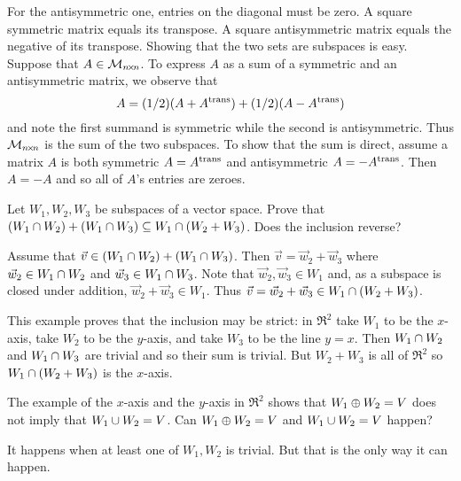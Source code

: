 \begin{exercises}
\begin{answer}
\begin{exparts}
          For the antisymmetric one, entries on the diagonal must be zero.
        \partsitem A square symmetric matrix equals its transpose.
          A square antisymmetric matrix equals the negative of its transpose.
        \partsitem Showing that the two sets are subspaces is easy.
         Suppose that \( A\in\mathcal{M}_{n \! \times \! n} \).
         To express $A$ as a sum of a symmetric and an antisymmetric matrix,
         we observe that
         \begin{equation*}
            A=(1/2)(A+{{A}^{\rm trans}}) + (1/2)(A-{{A}^{\rm trans}})
         \end{equation*}
         and note the first summand is symmetric while the second is 
         antisymmetric.
         Thus \( \mathcal{M}_{n \! \times \! n} \) is the sum of the two subspaces.
         To show that the sum is direct, 
         assume a matrix \( A \) is both symmetric
         \( A={{A}^{\rm trans}} \) and antisymmetric \( A=-{{A}^{\rm trans}} \).
         Then \( A=-A \) and so all of \( A \)'s entries are zeroes.  
      \end{exparts}
     \end{answer}
  \item 
    Let \( W_1,W_2,W_3 \) be subspaces of a vector space.
    Prove that \( (W_1\cap W_2)+(W_1\cap W_3)\subseteq
              W_1\cap (W_2+W_3) \).
    Does the inclusion reverse?
    \begin{answer}
      Assume that 
      \( \vec{v}\in (W_1\cap W_2)+(W_1\cap W_3) \).
      Then \( \vec{v}=\vec{w}_2+\vec{w}_3 \) where
      \( \vec{w}_2\in W_1\cap W_2 \) and
      \( \vec{w}_3\in W_1\cap W_3 \).
      Note that \( \vec{w}_2,\vec{w}_3\in W_1 \) and, as a subspace is closed
      under addition, \( \vec{w}_2+\vec{w}_3\in W_1 \).
      Thus \( \vec{v}=\vec{w}_2+\vec{w}_3\in W_1\cap(W_2+W_3) \).

      This example proves that the inclusion may be strict:
      in \( \Re^2 \) take \( W_1 \) to be the \( x \)-axis, take \( W_2 \)
      to be the \( y \)-axis, and take \( W_3 \) to be the line \( y=x \).
      Then \( W_1\cap W_2 \) and \( W_1\cap W_3 \) are
      trivial and so their sum is trivial.
      But \( W_2+W_3 \) is all of \( \Re^2 \) so
      \( W_1\cap(W_2+W_3) \) is the \( x \)-axis.  
     \end{answer}
  \item 
    The example of the $x$-axis and the $y$-axis in
    \( \Re^2 \) shows that \( W_1\oplus W_2=V \) does not imply that
    \( W_1\cup W_2=V \).
    Can \( W_1\oplus W_2=V \) and \( W_1\cup W_2=V \) happen?
    \begin{answer}
      It happens when at least one of \( W_1,W_2 \) is trivial.
      But that is the only way it can happen.


\end{answer}
\end{exercises}
